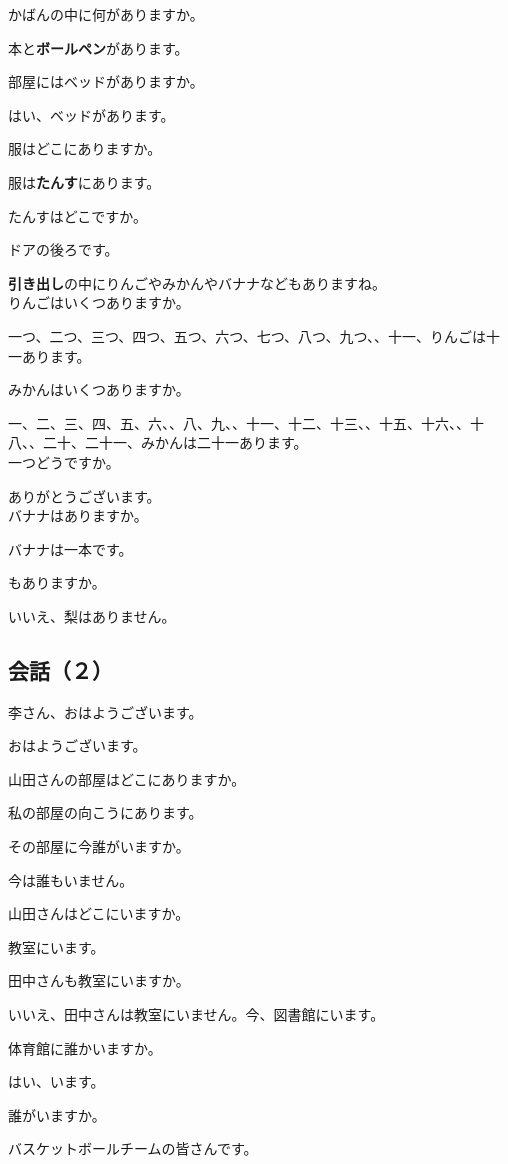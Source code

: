 \documentclass[a5j]{ltjarticle}
\newcommand*{\ZhangSpeaks}{\item[張：]}
\newcommand*{\TanakaSpeaks}{\item[田中：]}
\newcommand*{\LiSpeaks}{\item[李：]}
\begin{document}
\begin{dialogue}
  \TanakaSpeaks
  かばんの中に何がありますか。
  \LiSpeaks
  本と\textbf{ボールペン}があります。
  \TanakaSpeaks
  部屋にはベッドがありますか。
  \LiSpeaks
  はい、ベッドがあります。
  \TanakaSpeaks
  服はどこにありますか。
  \LiSpeaks
  服は\textbf{たんす}にあります。
  \TanakaSpeaks
  たんすはどこですか。
  \LiSpeaks
  ドアの後ろです。
  \TanakaSpeaks
  \textbf{引き出し}の中にりんごやみかんやバナナなどもありますね。\\
  りんごはいくつありますか。
  \LiSpeaks
  一つ、二つ、三つ、四つ、五つ、六つ、七つ、八つ、九つ、、十一、りんごは十一あります。
  \TanakaSpeaks
  みかんはいくつありますか。
  \LiSpeaks
  一、二、三、四、五、六、、八、九、、十一、十二、十三、、十五、十六、、十八、、二十、二十一、みかんは二十一あります。\\
  一つどうですか。
  \TanakaSpeaks
  ありがとうございます。\\
  バナナはありますか。
  \LiSpeaks
  バナナは一本です。
  \TanakaSpeaks
  もありますか。
  \LiSpeaks
  いいえ、梨はありません。
\end{dialogue}

\subsection*{会話（２）}

\begin{dialogue}[labelwidth=1.75\zw]
  \ZhangSpeaks
  李さん、おはようございます。
  \LiSpeaks
  おはようございます。
  \ZhangSpeaks
  山田さんの部屋はどこにありますか。
  \LiSpeaks
  私の部屋の向こうにあります。
  \ZhangSpeaks
  その部屋に今誰がいますか。
  \LiSpeaks
  今は誰もいません。
  \ZhangSpeaks
  山田さんはどこにいますか。
  \LiSpeaks
  教室にいます。
  \ZhangSpeaks
  田中さんも教室にいますか。
  \LiSpeaks
  いいえ、田中さんは教室にいません。今、図書館にいます。
  \ZhangSpeaks
  体育館に誰かいますか。
  \LiSpeaks
  はい、います。
  \ZhangSpeaks
  誰がいますか。
  \LiSpeaks
  バスケットボールチームの皆さんです。
\end{dialogue}
\end{document}

